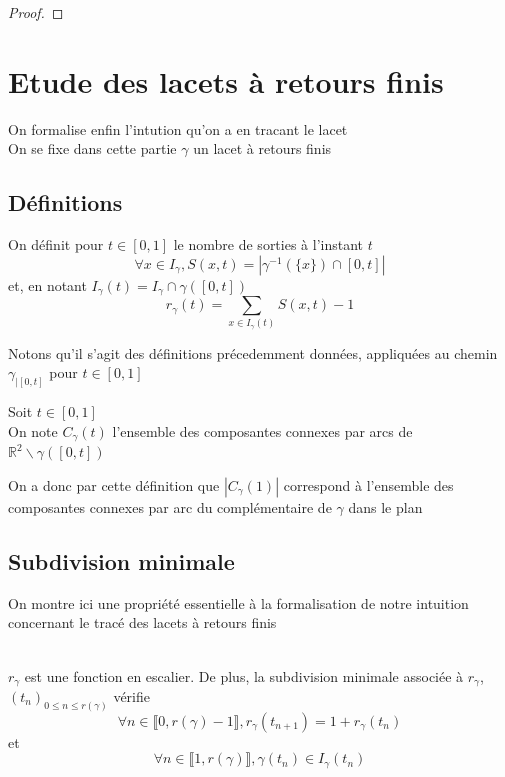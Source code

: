 \documentclass{article}
\begin{document}
\begin{flushleft}
\begin{proof}
\end{proof}

\section{Etude des lacets à retours finis}

On formalise enfin l'intution qu'on a en tracant le lacet\\
On se fixe dans cette partie $\gamma$ un lacet à retours finis

\subsection{Définitions}

\begin{tcolorbox}[colback = yellow!60!white, colframe = orange!90!white, title = Définition 4]
    On définit pour $t \in [0, 1]$ le nombre de sorties à l'instant $t$
    \[\forall x \in I_{\gamma}, S(x, t) = |\gamma^{-1}(\{x\}) \cap [0, t]|\]
    et, en notant $I_{\gamma}(t) = I_{\gamma} \cap \gamma([0, t])$
    \[r_{\gamma}(t) = \sum_{x \in I_{\gamma}(t)} S(x ,t) - 1\]
\end{tcolorbox}
\vspace{0.5cm}
Notons qu'il s'agit des définitions précedemment données, appliquées au chemin $\gamma_{\mid[0, t]}$ pour $t \in [0, 1]$
\vspace{0.5cm}
\begin{tcolorbox}[colback = yellow!60!white, colframe = orange!90!white, title = Définition 5]
    Soit $t \in [0, 1]$\\
    On note $C_{\gamma}(t)$ l'ensemble des composantes connexes par arcs de
    $\mathbb{R}^2 \backslash \gamma([0, t])$
\end{tcolorbox}

\vspace{0.5cm}
On a donc par cette définition que $|C_{\gamma}(1)|$ correspond à l'ensemble des composantes connexes par arc du
complémentaire de $\gamma$ dans le plan

\subsection{Subdivision minimale}

On montre ici une propriété essentielle à la formalisation de notre intuition concernant le tracé des lacets à retours finis
\\~\\
\begin{tcolorbox}[colback=purple!20!white, colframe=purple!60!white, title = Proposition 9]
    $r_{\gamma}$ est une fonction en escalier. De plus, la subdivision minimale
    associée à $r_{\gamma}$, $(t_n)_{0 \leq n \leq r(\gamma)}$ vérifie
    \[\forall n \in \llbracket 0, r(\gamma) -1 \rrbracket, r_{\gamma}(t_{n+1}) = 1 + r_{\gamma}(t_n)\]
    et
    \[ \forall n \in \llbracket 1, r(\gamma) \rrbracket, \gamma(t_n) \in I_{\gamma}(t_n) \]
\end{tcolorbox}
\vspace{0.5cm}


\end{flushleft}
\end{document}
